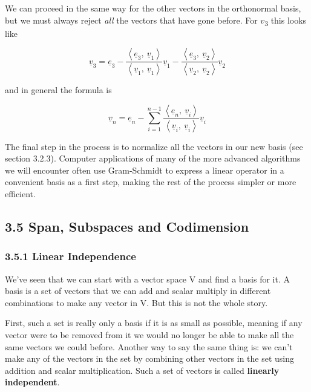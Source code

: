 \documentclass[oneside,english]{amsbook}
\numberwithin{section}{chapter}
\theoremstyle{plain}
\theoremstyle{definition}
\begin{document}
We can proceed in the same way for the other vectors in the orthonormal
basis, but we must always reject \emph{all} the vectors that have gone
before. For $v$\textsubscript{3} this looks like

\[{\underline{v}}_{3} = {\underline{e}}_{3} - \frac{\left\langle {\underline{e}}_{3},\ {\underline{v}}_{1} \right\rangle}{\left\langle {\underline{v}}_{1},\ {\underline{v}}_{1} \right\rangle}{\underline{v}}_{1} - \frac{\left\langle {\underline{e}}_{3},\ {\underline{v}}_{2} \right\rangle}{\left\langle {\underline{v}}_{2},\ {\underline{v}}_{2} \right\rangle}{\underline{v}}_{2}\]

and in general the formula is

\[{\underline{v}}_{n} = {\underline{e}}_{n} - \sum_{i = 1}^{n - 1}{\frac{\left\langle {\underline{e}}_{n},\ {\underline{v}}_{i} \right\rangle}{\left\langle {\underline{v}}_{i},\ {\underline{v}}_{i} \right\rangle}{\underline{v}}_{i}}\]

The final step in the process is to normalize all the vectors in our new
basis (see section 3.2.3). Computer applications of many of the more
advanced algorithms we will encounter often use Gram-Schmidt to express
a linear operator in a convenient basis as a first step, making the rest
of the process simpler or more efficient.

\subsection{3.5 Span, Subspaces and
	Codimension}\label{span-subspaces-and-codimension}

\subsubsection{3.5.1 Linear Independence}\label{linear-independence}

We've seen that we can start with a vector space V and find a basis for
it. A basis is a set of vectors that we can add and scalar multiply in
different combinations to make any vector in V. But this is not the
whole story.

First, such a set is really only a basis if it is as small as possible,
meaning if any vector were to be removed from it we would no longer be
able to make all the same vectors we could before. Another way to say
the same thing is: we can't make any of the vectors in the set by
combining other vectors in the set using addition and scalar
multiplication. Such a set of vectors is called \textbf{linearly
	independent}.
\end{document}
